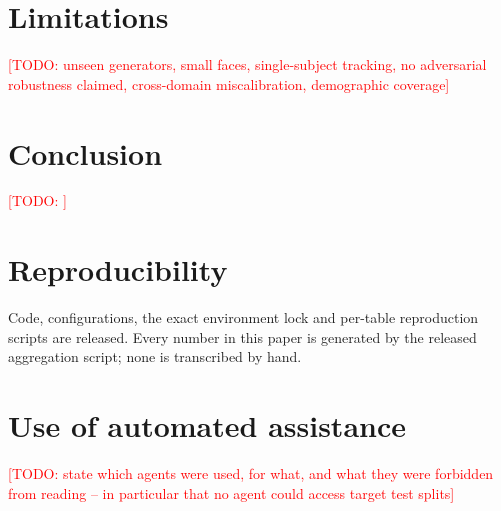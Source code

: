 \documentclass[conference]{IEEEtran}
\newcommand{\todo}[1]{\textcolor{red}{[TODO: #1]}}
\begin{document}
\section{Limitations}
\todo{unseen generators, small faces, single-subject tracking, no adversarial
robustness claimed, cross-domain miscalibration, demographic coverage}

\section{Conclusion}
\todo{}

\section*{Reproducibility}
Code, configurations, the exact environment lock and per-table reproduction
scripts are released. Every number in this paper is generated by the released
aggregation script; none is transcribed by hand.

\section*{Use of automated assistance}
\todo{state which agents were used, for what, and what they were forbidden
from reading -- in particular that no agent could access target test splits}



\end{document}
